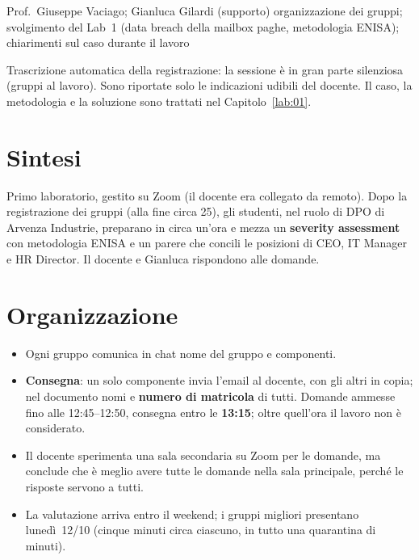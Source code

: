   {Prof.~Giuseppe Vaciago; Gianluca Gilardi (supporto)}
  {organizzazione dei gruppi; svolgimento del Lab~1 (data breach della mailbox paghe, metodologia
   ENISA); chiarimenti sul caso durante il lavoro}
\label{lez:2026-10-09}

\begin{nota}[Fonte]
Trascrizione automatica della registrazione: la sessione è in gran parte silenziosa (gruppi al
lavoro). Sono riportate solo le indicazioni udibili del docente. Il caso, la metodologia e la
soluzione sono trattati nel Capitolo~\ref{lab:01}.
\end{nota}

\section{Sintesi}
Primo laboratorio, gestito su Zoom (il docente era collegato da remoto). Dopo la registrazione dei gruppi (alla fine circa 25), gli
studenti, nel ruolo di DPO di Arvenza Industrie, preparano in circa un'ora e mezza un
\textbf{severity assessment} con metodologia ENISA e un parere che concili le posizioni di CEO,
IT Manager e HR Director. Il docente e Gianluca rispondono alle domande.

\section{Organizzazione}
\begin{itemize}
  \item Ogni gruppo comunica in chat nome del gruppo e componenti.
  \item \textbf{Consegna}: un solo componente invia l'email al docente, con gli altri in copia; nel
    documento nomi e \textbf{numero di matricola} di tutti. Domande ammesse fino alle 12:45--12:50,
    consegna entro le \textbf{13:15}; oltre quell'ora il lavoro non è considerato.
  \item Il docente sperimenta una sala secondaria su Zoom per le domande, ma conclude che è meglio
    avere tutte le domande nella sala principale, perché le risposte servono a tutti.
  \item La valutazione arriva entro il weekend; i gruppi migliori presentano lunedì~12/10 (cinque
    minuti circa ciascuno, in tutto una quarantina di minuti).
\end{itemize}


